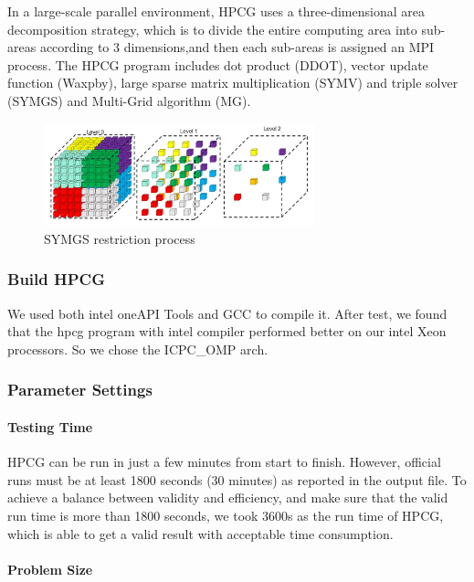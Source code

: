 \documentclass[a4paper,12pt]{article}
\begin{document}
In a large-scale parallel environment, HPCG uses a three-dimensional area decomposition strategy, which is to divide the entire computing area into sub-areas according to 3 dimensions,and then each sub-areas is assigned an MPI process. The HPCG program includes dot product (DDOT), vector update function (Waxpby), large sparse matrix multiplication (SYMV) and triple solver (SYMGS) and Multi-Grid algorithm (MG).

\begin{figure}[H]
    \centering
    \includegraphics[width=0.7\textwidth]{SYMGS_restriction_process.png}
    \caption{SYMGS restriction process}
    \label{fig:symgs_restriction}
\end{figure}

\subsubsection{Build HPCG}

We used both intel oneAPI Tools and GCC to compile it. After test, we found that the hpcg program with intel compiler performed better on our intel Xeon processors. So we chose the ICPC\_OMP arch.

\subsubsection{Parameter Settings}

\paragraph{Testing Time}

HPCG can be run in just a few minutes from start to finish. However, official runs must be at least 1800 seconds (30 minutes) as reported in the output file. To achieve a balance between validity and efficiency, and make sure that the valid run time is more than 1800 seconds, we took 3600s as the run time of HPCG, which is able to get a valid result with acceptable time consumption.

\paragraph{Problem Size}
\end{document}
